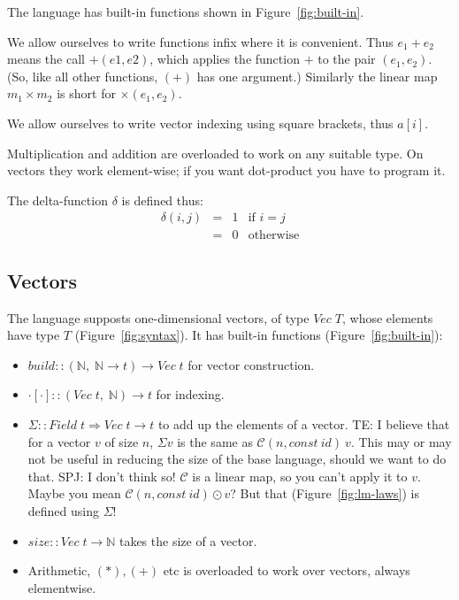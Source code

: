 \documentclass[sigplan,review]{acmart}
\renewcommand{\to}{\rightarrow}    %
\newcommand{\buildfun}{\mathit{build}}
\newcommand{\sumfun}{\Sigma}
\newcommand{\sizefun}{size}
\newcommand{\deltafun}{\delta}
\newcommand{\indexfun}[2]{#1[#2]}   %
\renewcommand{\vector}[1]{\mathit{Vec}\;#1}
\newcommand{\nat}{\mathbb{N}}        %
\newcommand{\darrow}{\Rightarrow}    %
\newcommand{\lmapply}{\odot}   %
\newcommand{\lmcomp}{\,\circ\,}   %
\newcommand{\lmpair}{\times}         %
\newcommand{\lmbuildt}{\mathcal C}             %
\newcommand{\simon}[1]{{\color{red}SPJ: #1}}
\newcommand{\tom}[1]{{\color{red}TE: #1}}
\begin{document}
The language has built-in functions shown in Figure~\ref{fig:built-in}.

We allow ourselves to write functions infix where it is convenient.
Thus $e_1 + e_2$ means the call $+(e1,e2)$, which applies the function $+$ to
the pair $(e_1,e_2)$.  (So, like all other functions, $(+)$ has one argument.)
Similarly the linear map $m_1 \lmpair m_2$ is short for $\lmpair(e_1,e_2)$.

We allow ourselves to write vector indexing using square brackets, thus $a[i]$.

Multiplication and addition are overloaded to work on any suitable type.
On vectors they work element-wise; if you want dot-product you have to program it.

The delta-function $\deltafun$ is defined thus:
$$
\begin{array}{rcll}
  \deltafun(i,j) & = & 1 & \mbox{if $i=j$} \\
  & = & 0 & \mbox{otherwise}
\end{array}
$$

\subsection{Vectors}

The language supposts one-dimensional vectors, of type $\vector{T}$,
whose elements have type $T$ (Figure~\ref{fig:syntax}).
It has built-in functions (Figure~\ref{fig:built-in}):
\begin{itemize}
\item $\buildfun :: (\nat,\; \nat \to t) \to \vector{t}$ for vector construction.
\item $\indexfun{\cdot}{\cdot} :: (\vector{t},\; \nat) \to t$ for indexing.
\item $\sumfun :: Field \; t \darrow \vector{t} \to t$ to add up the elements of a vector.
  \tom{I believe that for a vector $v$ of size $n$, $\sumfun v$ is the
    same as $\lmbuildt(n, const~ id)~ v$.  This may or may not be useful
    in reducing the size of the base language, should we want to do that.}
  \simon{I don't think so!  $\lmbuildt$ is a linear map, so you can't apply it to $v$.
    Maybe you mean $\lmbuildt(n, const~ id) \lmapply v$?  But that (Figure~\ref{fig:lm-laws}) is
    defined using $\sumfun$!}
\item $\sizefun :: \vector{t} \to \nat$ takes the size of a vector.
\item Arithmetic, $(*), (+)$ etc is overloaded to work over vectors, always elementwise.
\end{itemize}
\end{document}
